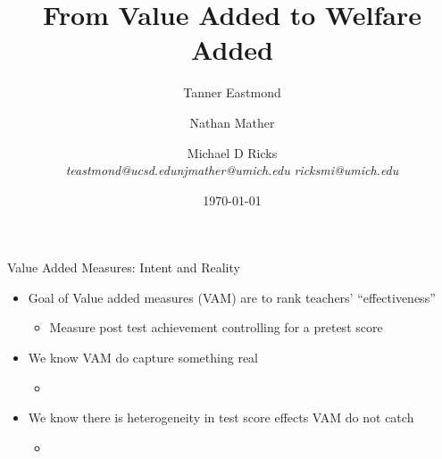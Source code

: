 \documentclass[t,aspectratio=169,11pt]{beamer}
\title{From Value Added to Welfare Added}
\author{Tanner Eastmond \hfill \and Nathan Mather   \and \hfill Michael D Ricks   \\   \textit{teastmond@ucsd.edu}\hfill \textit{njmather{\fontfamily{qag}\selectfont @}umich.edu} \hfill
\textit{ricksmi{\fontfamily{qag}\selectfont @}umich.edu} }
\institute{}
\date{\today}
\begin{document}
\begin{frame}[noframenumbering]
\titlepage 
\end{frame}


\begin{frame}{Value Added Measures: Intent and Reality}
\begin{itemize}
    \item Goal of Value added measures (VAM) are to rank teachers' ``effectiveness''
        \begin{itemize}
            \item Measure post test achievement controlling for a pretest score
        \end{itemize}
    \item We know VAM do capture something real
    \begin{itemize}
        \item {}
    \end{itemize}
    \item We know there is heterogeneity in test score effects VAM do not catch
    \begin{itemize}
        \item {}
    \end{itemize}
\end{itemize}
    \vspace{48pt}
\vfill
\end{frame}
\end{document}
